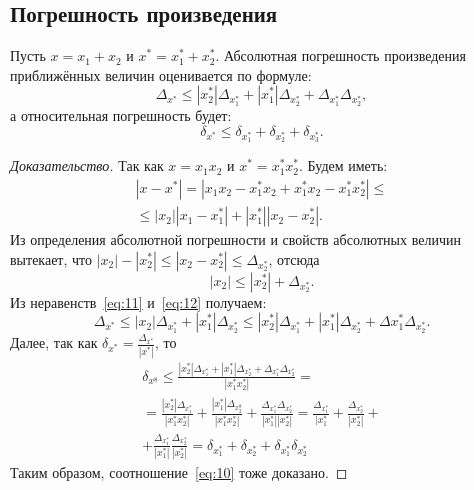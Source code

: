 \subsection{Погрешность произведения}
\begin{theorem}
	Пусть $x = x_1 + x_2$ и $x^* = x^*_1 + x^*_2$. Абсолютная погрешность
	произведения приближённых величин оценивается по формуле:
	\begin{equation}
		\Delta_{x^*} \leq |x^*_2| \Delta_{x^*_1} + |x^*_1|
		\Delta_{x^*_2} + \Delta_{x^*_1} \Delta_{x^*_2},
		\label{eq:9}
	\end{equation}
	а относительная погрешность будет:
	\begin{equation}
		\delta_{x^*} \leq \delta_{x^*_1} + \delta_{x^*_2} +
		\delta_{x^*_3}.
		\label{eq:10}
	\end{equation}
\end{theorem}
\begin{proof}[Доказательство]
	Так как $x = x_1 x_2$ и $x^* = x^*_1 x^*_2$. Будем иметь:
	\begin{equation}
		\begin{split}
			|x - x^*| = |x_1 x_2 - x^*_1 x_2 + x^*_1 x_2
			- x^*_1 x^*_2| \leq\\
			\leq |x_2| |x_1 - x^*_1| + |x^*_1| |x_2 - x^*_2|.
		\end{split}
		\label{eq:11}
	\end{equation}
	Из определения абсолютной погрешности и свойств абсолютных величин
	вытекает, что $|x_2| - |x^*_2| \leq |x_2 - x^*_2| \leq \Delta_{x^*_2}$,
	отсюда
	\begin{equation}
		|x_2| \leq |x^*_2| + \Delta_{x^*_2}.
		\label{eq:12}
	\end{equation}
	Из неравенств~\ref{eq:11} и~\ref{eq:12} получаем:
	$$\Delta_{x^*} \leq
	|x_2| \Delta_{x^*_1} + |x^*_1| \Delta_{x^*_2} \leq
	|x^*_2| \Delta_{x^*_1} + |x^*_1| \Delta_{x^*_2} +
	\Delta{x^*_1} \Delta_{x^*_2}. $$
	Далее, так как $\delta_{x^*} = \frac{\Delta_{x^*}}{|x^*|}$, то
	\begin{equation}
		\begin{split}
			\delta_{x^8} \leq
			\frac{|x^*_2| \Delta_{x^*_1} + |x^*_1| \Delta_{x^*_2} +
			\Delta_{x^*_1} \Delta_{x^*_2}}{|x^*_1 x^*_2|} = \\
			= \frac{|x^*_2| \Delta_{x^*_1}}{|x^*_1 x^*_2|} +
			\frac{|x^*_1| \Delta_{x^8_2}}{|x^*_1 x^*_2|} +
			\frac{\Delta_{x^*_1}\Delta_{x^*_2}}{|x^*_1| |x^*_2|} =
			\frac{\Delta_{x^*_1}}{|x^*_1} +
			\frac{\Delta_{x^*_2}}{|x^*_2|} +\\
			+ \frac{\Delta_{x^*_1}}{|x^*_1|}
			\frac{\Delta_{x^*_2}}{|x^*_2|} =
			\delta_{x^*_1} + \delta_{x^*_2} + \delta_{x^*_1} \delta_{x^*_2}
		\end{split}
	\end{equation}
	Таким образом, соотношение~\ref{eq:10} тоже доказано.
\end{proof}

